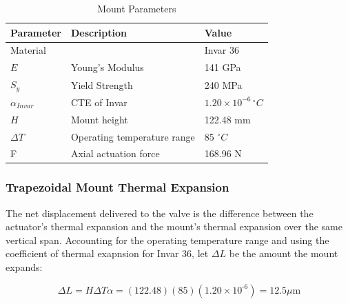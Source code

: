 \documentclass[12pt, letterpaper]{report}%
\newcounter{mycounter}           %
\newcounter{sub}[mycounter]      %
\newcommand{\degC}{^{\circ}C}    %
\begin{document}
             \begin{table}[H]
                \centering
                \caption{Mount Parameters}
                \label{tab:mount_parameters}
                \begin{tabularx}{\textwidth}{l X l}
                    \toprule
                    \textbf{Parameter} & \textbf{Description} & \textbf{Value} \\
                    \midrule
                    Material &
                    &
                    Invar 36
                        \\\addlinespace
                    $E$ &
                    Young's Modulus &
                    141 GPa
                    \\\addlinespace
                    $S_y$ &
                    Yield Strength &
                    240 MPa
                    \\\addlinespace
                    $\alpha_{Invar}$ &
                    CTE of Invar &
                    $1.20 \times 10^{-6} \, \degC$
                    \\\addlinespace
                    $H$ &
                    Mount height &
                    122.48 mm
                    \\\addlinespace
                    $\Delta{T}$ &
                    Operating temperature range &
                    85 $\degC$
                    \\\addlinespace
                    F &
                    Axial actuation force &
                    168.96 N
                    \\\bottomrule
                \end{tabularx}
            \end{table}

        \subsubsection{Trapezoidal Mount Thermal Expansion}
        \label{tab:trapmountthermalexpansion}
            The net displacement delivered to the valve is the difference between the actuator's thermal expansion and the mount's thermal expansion over the same vertical span. Accounting for the operating temperature range and using the coefficient of thermal exapnsion for Invar 36,
            let $\Delta L$ be the amount the mount expands:
            
            $$\Delta L = H \Delta T \alpha = (122.48)(85)(1.20\times10^\text{-6}) = 12.5 \mu\text{m}$$
           
\end{document}
